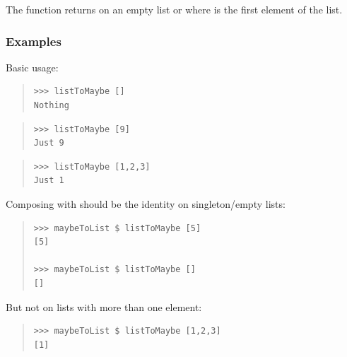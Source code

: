 \begin{haddockdesc}
\item[\begin{tabular}{@{}l}
listToMaybe :: {\char 91}a{\char 93} -> Maybe a
\end{tabular}]
{\haddockbegindoc
The  function returns  on an empty list
 or  where  is the first element of the list.\par
\subsubsection*{\textbf{Examples}}
Basic usage:\par
\begin{quote}
{\haddockverb\begin{verbatim}
>>> listToMaybe []
Nothing

\end{verbatim}}
\end{quote}
\begin{quote}
{\haddockverb\begin{verbatim}
>>> listToMaybe [9]
Just 9

\end{verbatim}}
\end{quote}
\begin{quote}
{\haddockverb\begin{verbatim}
>>> listToMaybe [1,2,3]
Just 1

\end{verbatim}}
\end{quote}
Composing  with  should be the identity
 on singleton/empty lists:\par
\begin{quote}
{\haddockverb\begin{verbatim}
>>> maybeToList $ listToMaybe [5]
[5]

>>> maybeToList $ listToMaybe []
[]

\end{verbatim}}
\end{quote}
But not on lists with more than one element:\par
\begin{quote}
{\haddockverb\begin{verbatim}
>>> maybeToList $ listToMaybe [1,2,3]
[1]

\end{verbatim}}
\end{quote}}
\end{haddockdesc}
